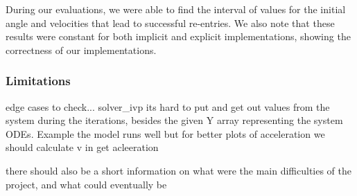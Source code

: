\documentclass[runningheads]{llncs}
\begin{document}
During our evaluations, we were able to find the interval of values for the initial angle and velocities that lead to successful re-entries.  We also note that these results were constant for both implicit and explicit implementations, showing the correctness of our implementations.

\subsubsection*{Limitations}
edge cases to check... 
solver\_ivp its hard to put and get out values from the system during the iterations, besides the given Y array representing the system ODEs. Example the model runs well but for better plots of acceleration we should calculate v in get acleeration 

 there should also be a short information on what were the main difficulties of the project, and what could eventually be



\end{document}
